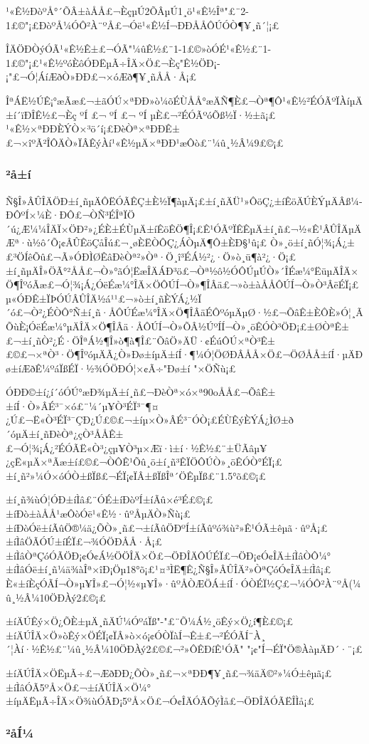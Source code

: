 ¹«Ê½ÐòºÅ°´ÕÂ±àÅÅ£¬ÈçµÚ2ÕÂµÚ1¸ö¹«Ê½Îª"£¨2-1£©"¡£ÐòºÅ¼ÓÔ²À¨ºÅ£¬Óë¹«Ê½Í¬ÐÐÅÅÔÚÓÒ¶¥¸ñ´¦¡£

ÎÄÖÐÒýÓÃ¹«Ê½Ê±£¬ÓÃ"¼ûÊ½£¨1-1£©»òÓÉ¹«Ê½£¨1-1£©"¡£¹«Ê½ºóÈôÓÐËµÃ÷ÎÄ×Ö£¬Èç"Ê½ÖÐ¡­¡­"£¬Ó¦ÁíÆðÒ»ÐÐ£¬×óÆð¶¥¸ñÅÅ·Å¡£

ÎªÁË½ÚÊ¡°æÃæ£¬±ãÓÚ×ªÐÐ»ò¼õÉÙÅÅ°æÄÑ¶È£¬Òª¶Ô¹«Ê½²ÉÓÃºÏÀíµÄ±í´ïÐÎÊ½£¬Èç ºÍ £¬ ºÍ £¬ ºÍ µÈ£¬²ÉÓÃºóÕß½Ï·½±ã¡£
¹«Ê½×ªÐÐÈÝÒ×³ö´í¡£ÐèÒª×ªÐÐÊ±£¬×îºÃ²ÎÔÄÒ»ÏÂÊýÀí¹«Ê½µÄ×ªÐÐ¹æÔò£¨¼û¸½Â¼9£©¡£

\subsubsection{²å±í}

Ñ§Î»ÂÛÎÄÖÐ±í¸ñµÄÔËÓÃÊÇ±È½Ï¶àµÄ¡£±í¸ñÄÜ¹»ÔöÇ¿±íÊöÄÚÈÝµÄÂß¼­ÐÔºÍ×¼È·ÐÔ£¬ÒÑ³ÉÎªÏÖ´ú¿Æ¼¼ÎÄÏ×ÖÐ²»¿ÉÈ±ÉÙµÄ±íÊöÊÖ¶Î¡£Ê¹ÓÃºÏÊÊµÄ±í¸ñ£¬½«Ê¹ÂÛÎÄµÄÆª·ù½ô´Õ¡¢ÂÛÊöÇåÎú£¬¸øÈËÒÔÇ¿ÁÒµÄ¶Ô±ÈÐ§¹û¡£
Ò»¸ö±í¸ñÓ¦¾¡Á¿±£³ÖÍêÕû£¬Ã»ÓÐÌØÊâÐèÒª²»Òª·Ö¸î³ÉÁ½²¿·Ö»ò¸ü¶à²¿·Ö¡£±í¸ñµÄÎ»ÖÃ°²ÅÅ£¬Ò»°ãÓ¦ËæÎÄÁÐ³ö£¬Òª½ô½ÓÔÚµÚÒ»´ÎÉæ¼°ËüµÄÎÄ×Ö¶ÎºóÃæ£¬Ó¦¾¡Á¿ÓëÉæ¼°ÎÄ×ÖÔÚÍ¬Ò»¶ÎÂä£¬»ò±àÅÅÔÚÍ¬Ò»Ò³ÂëÉÏ¡£µ«ÓÐÊ±ÏÞÓÚÂÛÎÄ½á¹¹£¬»ò±í¸ñÈÝÁ¿½Ï´ó£¬Ò²¿ÉÒÔ°Ñ±í¸ñ·ÅÔÚÉæ¼°ÎÄ×Ö¶ÎÂäÉÔºóµÄµØ·½£¬ÕâÊ±ÈÔÈ»Ó¦¸ÃÕùÈ¡ÓëÉæ¼°µÄÎÄ×Ö¶ÎÂä·ÅÔÚÍ¬Ò»ÕÂ½ÚºÍÍ¬Ò»¸öÊÓÒ³ÖÐ¡£±ØÒªÊ±£¬±í¸ñÒ²¿É·ÖÎªÁ½¶Î»ò¶à¶Î£¨ÕâÖ»ÄÜ·¢ÉúÔÚ×ªÒ³Ê±£©£¬×ªÒ³·Ö¶ÎºóµÄÃ¿Ò»Ðø±íµÄ±íÍ·¶¼Ó¦ÖØÐÂÅÅ×Ö£¬ÖØÅÅ±íÍ·µÄÐø±íÆðÊ¼ºáÏßÉÏ·½¾ÓÖÐÓ¦×¢Ã÷"Ðø±í "×ÖÑù¡£

ÓÐÐ©±í¿í´óÓÚ°æÐ¾µÄ±í¸ñ£¬ÐèÒª×ó×ª90oÅÅ£¬ÕâÊ±±íÍ·Ò»ÂÉ³¯×ó£¨¼´µ¥Ò³ÉÏ³¯¶¤¿Ú£¬Ë«Ò³ÉÏ³¯ÇÐ¿Ú£©£¬±íµ×Ò»ÂÉ³¯ÓÒ¡£ÉÙÊýÈÝÁ¿ÌØ±ð´óµÄ±í¸ñÐèÒª¿çÒ³ÅÅÊ±£¬Ó¦¾¡Á¿²ÉÓÃË«Ò³¿çµ¥Ò³µ×Æï·ì±í·½Ê½£¨±ÜÃâµ¥¿çË«µÄ×ªÃæ±í£©£¬ÒÔÊ¹Õû¸ö±í¸ñ³ÊÏÖÔÚÒ»¸öÊÓÒ°ÉÏ¡£
±í¸ñ²»¼Ó×óÓÒ±ßÏß£¬ÉÏ¡¢ÏÂ±ßÏßÎª´ÖÊµÏß£¨1.5°õ£©¡£

±í¸ñ¾ùÓ¦ÓÐ±íÌâ£¨ÓÉ±íÐòºÍ±íÃû×é³É£©¡£±íÐò±àÅÅ¹æÔòÓë¹«Ê½·ûºÅµÄÒ»Ñù¡£±íÐòÓë±íÃûÖ®¼ä¿ÕÒ»¸ñ£¬±íÃûÖÐºÍ±íÃûºó¾ù²»Ê¹ÓÃ±êµã·ûºÅ¡£±íÌâÖÃÓÚ±íÉÏ£¬¾ÓÖÐÅÅ·Å¡£±íÌâÒªÇóÓÃÖÐ¡¢Ó¢Á½ÖÖÎÄ×Ö£¬ÖÐÎÄÔÚÉÏ£¬ÖÐ¡¢Ó¢ÎÄ±íÌâÒÔ¼°±íÌâÓë±í¸ñ¼ä¾àÎª×îÐ¡Öµ18°õ¡£¹¤³ÌË¶Ê¿Ñ§Î»ÂÛÎÄ²»ÒªÇóÓ¢ÎÄ±íÌâ¡£
È«±íÈçÓÃÍ¬Ò»µ¥Î»£¬Ó¦½«µ¥Î»·ûºÅÒÆÖÁ±íÍ·ÓÒÉÏ½Ç£¬¼ÓÔ²À¨ºÅ(¼û¸½Â¼10ÖÐÀý2£©¡£

±íÄÚÊý×Ö¿ÕÈ±µÄ¸ñÄÚ¼ÓºáÏß"-"£¨Õ¼Á½¸öÊý×Ö¿í¶È£©¡£±íÄÚÎÄ×Ö»òÊý×ÖÉÏ¡¢ÏÂ»ò×ó¡¢ÓÒÏàÍ¬Ê±£¬²ÉÓÃÍ¨À¸´¦Àí·½Ê½£¨¼û¸½Â¼10ÖÐÀý2£©£¬²»ÔÊÐíÊ¹ÓÃ" "¡¢"Í¬ÉÏ"Ö®ÀàµÄÐ´·¨¡£

±íÄÚÎÄ×ÖËµÃ÷£¬ÆðÐÐ¿ÕÒ»¸ñ£¬×ªÐÐ¶¥¸ñ£¬¾äÄ©²»¼Ó±êµã¡£±íÌâÓÃ5ºÅ×Ö£¬±íÄÚÎÄ×Ö¼°±íµÄËµÃ÷ÎÄ×Ö¾ùÓÃÐ¡5ºÅ×Ö£¬Ó¢ÎÄÓÃÕýÌå£¬ÖÐÎÄÓÃËÎÌå¡£

\subsubsection{²åÍ¼}

